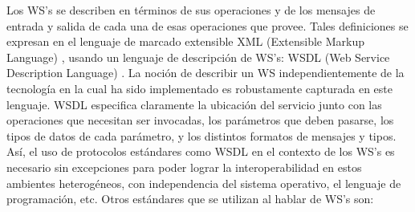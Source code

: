 Los WS's se describen en términos de sus operaciones y de los mensajes de entrada y salida de cada una de esas operaciones que provee. Tales definiciones se expresan en el lenguaje de marcado extensible XML (Extensible Markup Language) \cite{XML}, usando un lenguaje de descripción de WS's: WSDL (Web Service Description Language)\cite{WSDL2.0-0} \cite{WSDL2.0-1}. La noción de describir un WS independientemente de la tecnología en la cual ha sido implementado es robustamente capturada en este lenguaje. WSDL especifica claramente la ubicación del servicio junto con las operaciones que necesitan ser invocadas, los parámetros que deben pasarse, los tipos de datos de cada parámetro, y los distintos formatos de mensajes y tipos.\\ 

Así, el uso de protocolos estándares como WSDL en el contexto de los WS's es necesario sin excepciones para poder lograr la interoperabilidad en estos ambientes heterogéneos, con independencia del sistema operativo, el lenguaje de programación, etc. Otros estándares que se utilizan al hablar de WS's son:
